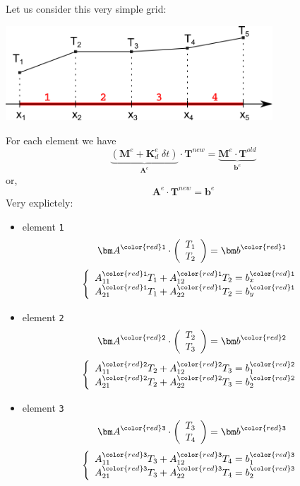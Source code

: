 Let us consider this very simple grid:
\begin{center}
\includegraphics[width=10cm]{images/oneD/grid5}
\end{center}
For each element we have
\[
\underbrace{( {\bm M}^e +  {\bm K}_d^e \; \delta t )}_{\bm A^{e}} \cdot {\bm T}^{new} =  \underbrace{{\bm M}^e \cdot  {\bm T}^{old} }_{\bm b^{e}}
\]
or, 
\[
{\bm A}^{e}\cdot {\bm T}^{new} =  {\bm b}^{e}
\]
Very explictely:
\begin{itemize}
\item element {\color{red}\tt 1} 
\[
{\bm A}^{\color{red} \tt 1}  \cdot 
\left(
\begin{array}{c}
T_1 \\ T_2
\end{array}
\right)
 =  {\bm b}^{\color{red} \tt 1}
\]
\[
\left\{ 
\begin{array}{l}
A_{11}^{{\color{red}\tt 1}} T_1 + A_{12}^{{\color{red}\tt 1}} T_2 = b^{{\color{red} \tt 1}}_x \\
A_{21}^{{\color{red}\tt 1}} T_1 + A_{22}^{{\color{red}\tt 1}} T_2 = b^{{\color{red} \tt 1}}_y
\end{array}
\right.
\]

\item element {\color{red}\tt 2} 
\[
{\bm A}^{\color{red} \tt 2}  \cdot 
\left(
\begin{array}{c}
T_2 \\ T_3
\end{array}
\right)
 =  {\bm b}^{\color{red} \tt 2}
\]
\[
\left\{ 
\begin{array}{l}
A_{11}^{{\color{red}\tt 2}} T_2 + A_{12}^{{\color{red}\tt 2}} T_3 = b^{{\color{red} \tt 2}}_1 \\
A_{21}^{{\color{red}\tt 2}} T_2 + A_{22}^{{\color{red}\tt 2}} T_3 = b^{{\color{red} \tt 2}}_2
\end{array}
\right.
\]


\item element {\color{red}\tt 3} 
\[
{\bm A}^{\color{red} \tt 3}  \cdot 
\left(
\begin{array}{c}
T_3 \\ T_4
\end{array}
\right)
 =  {\bm b}^{\color{red} \tt 3}
\]
\[
\left\{ 
\begin{array}{l}
A_{11}^{{\color{red}\tt 3}} T_3 + A_{12}^{{\color{red} \tt 3}} T_4 = b^{{\color{red} \tt 3}}_1 \\
A_{21}^{{\color{red}\tt 3}} T_3 + A_{22}^{{\color{red} \tt 3}} T_4 = b^{{\color{red} \tt 3}}_2
\end{array}
\right.
\]



\end{itemize}
